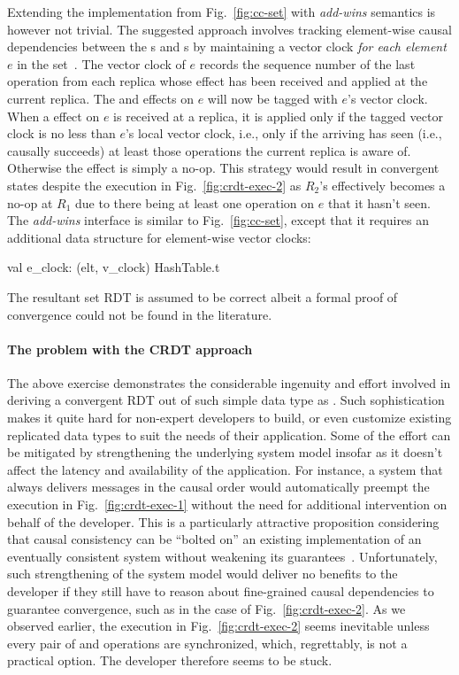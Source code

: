 Extending the  implementation from Fig.~\ref{fig:cc-set} with
\emph{add-wins} semantics is however not trivial. The suggested
approach involves tracking element-wise causal dependencies between
the s and s by maintaining a vector clock \emph{for
each element} $e$ in the set~\cite{zawirski-thesis}. The vector clock
of $e$ records the sequence number of the last  operation
from each replica whose effect has been received and applied at the
current replica. The  and  effects on $e$ will now be
tagged with $e$'s vector clock. When a  effect on $e$ is
received at a replica, it is applied only if the tagged vector clock
is no less than $e$'s local vector clock, i.e., only if the arriving
 has seen (i.e., causally succeeds) at least those
 operations the current replica is aware of.  Otherwise
the effect is simply a no-op. This strategy would result in convergent
states despite the execution in Fig.~\ref{fig:crdt-exec-2} as $R_2$'s
 effectively becomes a no-op at $R_1$ due to there being at
least one  operation on $e$ that it hasn't seen. The
\emph{add-wins}  interface is similar to Fig.~\ref{fig:cc-set},
except that it requires an additional data structure for
element-wise vector clocks: 
\begin{ocaml}
  val e_clock: (elt, v_clock) HashTable.t
\end{ocaml}
The resultant set RDT is assumed to be correct albeit a formal proof
of convergence could not be found in the literature. 

\noindent\paragraph{The problem with the CRDT approach} The above
exercise demonstrates the considerable ingenuity and effort involved
in deriving a convergent RDT out of such simple data type as .
Such sophistication makes it quite hard for non-expert developers to
build, or even customize existing replicated data types to suit the
needs of their application. Some of the effort can be mitigated by
strengthening the underlying system model insofar as it doesn't affect
the latency and availability of the application. For instance, a
system that always delivers messages in the causal order would
automatically preempt the execution in Fig.~\ref{fig:crdt-exec-1}
without the need for additional intervention on behalf of the
developer. This is a particularly attractive proposition considering
that causal consistency can be ``bolted on'' an existing
implementation of an eventually consistent system without weakening
its guarantees~\cite{BoltOn}. Unfortunately, such strengthening of the
system model would deliver no benefits to the developer if they still
have to reason about fine-grained causal dependencies to guarantee
convergence, such as in the case of Fig.~\ref{fig:crdt-exec-2}. As we
observed earlier, the execution in Fig.~\ref{fig:crdt-exec-2} seems
inevitable unless every pair of  and  operations are
synchronized, which, regrettably, is not a practical option. The
developer therefore seems to be stuck.

